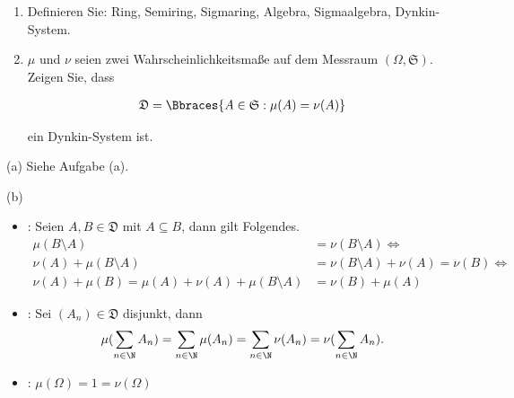 
\begin{exercise}

\phantom{}

\begin{enumerate}[label = (\alph*)]

  \item
  Definieren Sie: Ring, Semiring, Sigmaring, Algebra, Sigmaalgebra, Dynkin-System.
  
  \item
  $\mu$ und $\nu$ seien zwei Wahrscheinlichkeitsmaße auf dem Messraum $(\Omega, \mathfrak{S})$. Zeigen Sie, dass
  
  \begin{align*}
    \mathfrak{D} = \Bbraces{A \in \mathfrak{S} : \mu(A) = \nu(A)}
  \end{align*}
  
  ein Dynkin-System ist.

\end{enumerate}

\end{exercise}


\begin{solution}

(a) Siehe Aufgabe (a).

(b)

\begin{itemize}

  \item {}: Seien $A, B \in \mathfrak{D}$ mit $A \subseteq B$, dann gilt Folgendes.
  \begin{align*}
    \mu(B \setminus A)
    & =
    \nu(B \setminus A)
    \Leftrightarrow \\
    \nu(A) + \mu(B \setminus A)
    & =
    \nu(B \setminus A) + \nu(A)
    =
    \nu(B)
    \Leftrightarrow \\
    \nu(A) + \mu(B)
    =
    \mu(A) + \nu(A) + \mu(B \setminus A)
    & =
    \nu(B) + \mu(A)
  \end{align*}

  \item {}: Sei $(A_n) \in \mathfrak{D}$ disjunkt, dann
  \begin{align*}
    \mu(\sum_{n \in \N} A_n)
    =
    \sum_{n \in \N} \mu(A_n)
    =
    \sum_{n \in \N} \nu(A_n)
    =
    \nu(\sum_{n \in \N} A_n).
  \end{align*}

  \item {}: $\mu(\Omega) = 1 = \nu(\Omega)$

\end{itemize}

\end{solution}

